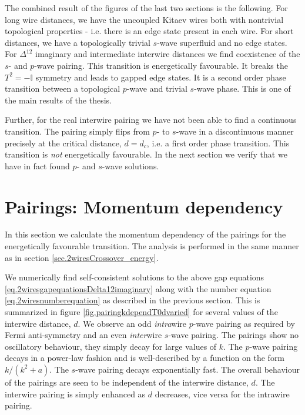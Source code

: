 The combined result of the figures of the last two sections is the following. For long wire distances, we have the uncoupled Kitaev wires both with nontrivial topological properties - i.e. there is an edge state present in each wire. For short distances, we have a topologically trivial $s$-wave superfluid and no edge states. For $\Delta^{12}$ imaginary and intermediate interwire distances we find coexistence of the $s$- and $p$-wave pairing. This transition is energetically favourable. It breaks the $T^2 = -\mathbb{I}$ symmetry and leads to gapped edge states. It is a second order phase transition between a topological $p$-wave and trivial $s$-wave phase. This is one of the main results of the thesis. 

Further, for the real interwire pairing we have not been able to find a continuous transition. The pairing simply flips from $p$- to $s$-wave in a discontinuous manner precisely at the critical distance, $d = d_c$, i.e. a first order phase transition. This transition is \textit{not} energetically favourable. In the next section we verify that we have in fact found $p$- and $s$-wave solutions. 


\section{Pairings: Momentum dependency} \label{sec.pairingsfunctionalbehaviour}
In this section we calculate the momentum dependency of the pairings for the energetically favourable transition. The analysis is performed in the same manner as in section \ref{sec.2wiresCrossover_energy}.

We numerically find self-consistent solutions to the above gap equations \eqref{eq.2wiresgapequationsDelta12imaginary} along with the number equation \eqref{eq.2wiresnumberequation} as described in the previous section. This is summarized in figure \ref{fig.pairingkdependT0dvaried} for several values of the interwire distance, $d$. We observe an odd \textit{intra}wire $p$-wave pairing as required by Fermi anti-symmetry and an even \textit{inter}wire $s$-wave pairing. The pairings show no oscillatory behaviour, they simply decay for large values of $k$. The $p$-wave pairing decays in a power-law fashion and is well-described by a function on the form $k / (k^2 + a)$. The $s$-wave pairing decays exponentially fast. The overall behaviour of the pairings are seen to be independent of the interwire distance, $d$. The interwire pairing is simply enhanced as $d$ decreases, vice versa for the intrawire pairing.  

